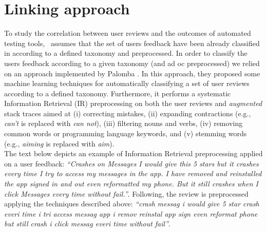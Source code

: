 \section{Linking approach}
\label{approach:linking}
\label{par: infusa}
To study the correlation between user reviews and the outcomes of automated testing tools, \toolname\ assumes that the set of users feedback have been already classified in according to a defined taxonomy and preprocessed.
In order to classify the users feedback according to a given taxonomy (and ad oc preprocessed) we relied on an approach implemented by Palomba \etal \cite{Palomba2017}. 
In this approach, they proposed some machine learning techniques for automatically classifying a set of user reviews according to a defined taxonomy. 
Furthermore, it performs a systematic Information Retrieval (IR) preprocessing \cite{BaezaYates:1999} on both the user reviews and \textit{augmented} stack traces aimed at (i) correcting mistakes, (ii) expanding contractions (e.g., \textit{can’t} is replaced with \textit{can not}), (iii) filtering nouns and verbs, (iv) removing common words or programming language keywords, and (v) stemming words (e.g., \textit{aiming} is replaced with \textit{aim}). \\
The text below depicts an example of Information Retrieval preprocessing applied on a user feedback: 
\smallbreak
\emph{\small``Crashes on Messages I would give this 5 stars but it crashes every time I try to access my messages in the app. I have removed and reinstalled the app  signed in and out  even reformatted my phone. But it still crashes when I click Messages  every time without fail.''}. 
\smallbreak
\hspace{-1.5em}Following, the review is preprocessed applying the techniques described above:
\smallbreak
\emph{\small``crash messag i would give 5 star crash everi time i tri access messag app i remov reinstal app  sign  even reformat phone but still crash i click messag  everi time without fail''}. 
\smallbreak


